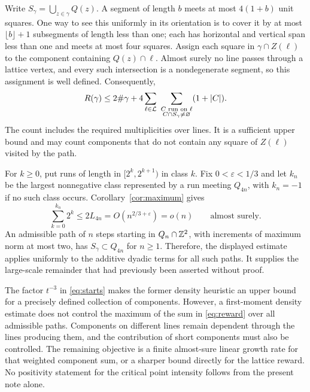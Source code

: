 \documentclass[11pt,letterpaper]{article}
\begin{document}
Write $S_\gamma=\bigcup_{z\in\gamma}Q(z)$. A segment of length $b$ meets at most $4(1+b)$ unit squares. One way to see this uniformly in its orientation is to cover it by at most $\lfloor b\rfloor+1$ subsegments of length less than one; each has horizontal and vertical span less than one and meets at most four squares. Assign each square in $\gamma\cap Z(\ell)$ to the component containing $Q(z)\cap\ell$. Almost surely no line passes through a lattice vertex, and every such intersection is a nondegenerate segment, so this assignment is well defined. Consequently,
\begin{equation}\label{eq:reward}
 R(\gamma)\le2\#\gamma+
  4\sum_{\ell\in\cL}\ 
   \sum_{\substack{C\text{ run on }\ell\\ C\cap S_\gamma\ne\varnothing}}
                     (1+|C|).
\end{equation}
The count includes the required multiplicities over lines. It is a sufficient upper bound and may count components that do not contain any square of $Z(\ell)$ visited by the path.

For $k\ge0$, put runs of length in $[2^k,2^{k+1})$ in class $k$. Fix $0<\varepsilon<1/3$ and let $k_n$ be the largest nonnegative class represented by a run meeting $Q_{4n}$, with $k_n=-1$ if no such class occurs. Corollary~\ref{cor:maximum} gives
\[
 \sum_{k=0}^{k_n}2^k\le2L_{4n}
           =O(n^{2/3+\varepsilon})=o(n)
           \qquad\text{almost surely}.
\]
An admissible path of $n$ steps starting in $Q_n\cap\mathbb Z^2$, with increments of maximum norm at most two, has $S_\gamma\subset Q_{4n}$ for $n\ge1$. Therefore, the displayed estimate applies uniformly to the additive dyadic terms for all such paths. It supplies the large-scale remainder that had previously been asserted without proof.

The factor $t^{-3}$ in \eqref{eq:starts} makes the former density heuristic an upper bound for a precisely defined collection of components. However, a first-moment density estimate does not control the maximum of the sum in \eqref{eq:reward} over all admissible paths. Components on different lines remain dependent through the lines producing them, and the contribution of short components must also be controlled. The remaining objective is a finite almost-sure linear growth rate for that weighted component sum, or a sharper bound directly for the lattice reward. No positivity statement for the critical point intensity follows from the present note alone.



\end{document}
